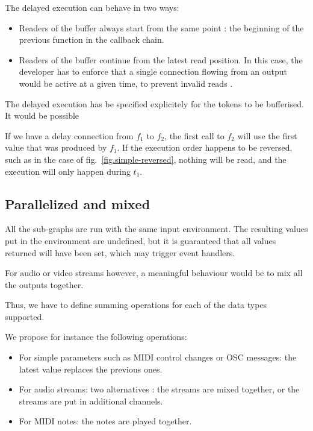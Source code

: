 \documentclass{article}
\begin{document}
	The delayed execution can behave in two ways:
	\begin{itemize}
		\item Readers of the buffer always start from the same point : the beginning of the previous function in the callback chain.
		\item Readers of the buffer continue from the latest read position.
        In this case, the developer has to enforce that a single connection flowing from an output would be active at a given time, to prevent invalid reads .%
	\end{itemize}
	
    
    The delayed execution has be specified explicitely for the tokens to be bufferised.
    It would be possible
    
    If we have a delay connection from $f_1$ to $f_2$, the first call to $f_2$ will use the first value that was produced by $f_1$.
    If the execution order happens to be reversed, such as in the case of fig.~\ref{fig.simple-reversed}, nothing will be read, and the execution will only happen during $t_1$.
	
	\subsection{Parallelized and mixed}
	All the sub-graphs are run with the same input environment. 
	The resulting values put in the environment are undefined, but it is guaranteed that all values returned will have been set, which may trigger event handlers.
    
    For audio or video streams however, a meaningful behaviour would be to mix all the outputs together.
    
    Thus, we have to define summing operations for each of the data types supported.
    
    We propose for instance the following operations: 
    \begin{itemize}
        \item For simple parameters such as MIDI control changes or OSC messages: the latest value replaces the previous ones.
        \item For audio streams: two alternatives : the streams are mixed together, or the streams are put in additional channels.
        \item For MIDI notes: the notes are played together.
    \end{itemize}
\end{document}
